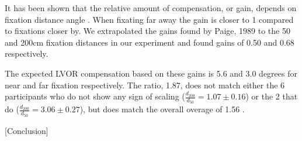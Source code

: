 It has been shown that the relative amount of compensation, or gain, depends on fixation distance angle \cite{paige1989, busettini1994,paige1998}. When fixating far away the gain is closer to 1 compared to fixations closer by. We extrapolated the gains found by Paige, 1989 to the 50 and 200cm fixation distances in our experiment and found gains of 0.50 and 0.68 respectively.

The expected LVOR compensation based on these gains is 5.6 and 3.0 degrees for near and far fixation respectively. The ratio, 1.87, does not match either the 6 participants who do not show any sign of scaling ($\frac{d_{200}}{d_{50}} = 1.07 \pm 0.16$) or the 2 that do ($\frac{d_{200}}{d_{50}} = 3.06 \pm 0.27$), but does match the overall overage of  1.56 .

[Conclusion]